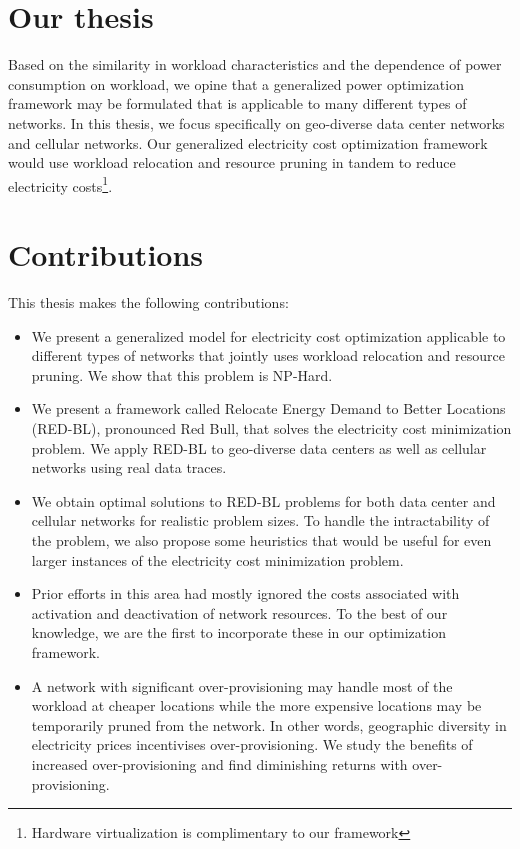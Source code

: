 \section{Our thesis} Based on the similarity in workload characteristics and the dependence of power consumption on workload, we opine that a generalized power optimization framework may be formulated that is applicable to many different types of networks. In this thesis, we focus specifically on geo-diverse data center networks and cellular networks. Our generalized electricity cost optimization framework would use workload relocation and resource pruning in tandem to reduce electricity costs\footnote{Hardware virtualization is complimentary to our framework}. 

\section{Contributions} This thesis makes the following contributions:

\begin{itemize}
\item We present a generalized model for electricity cost optimization applicable to different types of networks that jointly uses workload relocation and resource pruning. We show that this problem is NP-Hard.
\item We present a framework called Relocate Energy Demand to Better Locations (RED-BL), pronounced Red Bull, that solves the electricity cost minimization problem. We apply RED-BL to geo-diverse data centers as well as cellular networks using real data traces.
\item We obtain optimal solutions to RED-BL problems for both data center and cellular networks for realistic problem sizes. To handle the intractability of the problem, we also propose some heuristics that would be useful for even larger instances of the electricity cost minimization problem. 
\item Prior efforts in this area had mostly ignored the costs associated with activation and deactivation of network resources. To the best of our knowledge, we are the first to incorporate these in our optimization framework.
\item A network with significant over-provisioning may handle most of the workload at cheaper locations while the more expensive locations may be temporarily pruned from the network. In other words, geographic diversity in electricity prices incentivises over-provisioning. We study the benefits of increased over-provisioning and find diminishing returns with over-provisioning.
\end{itemize}

